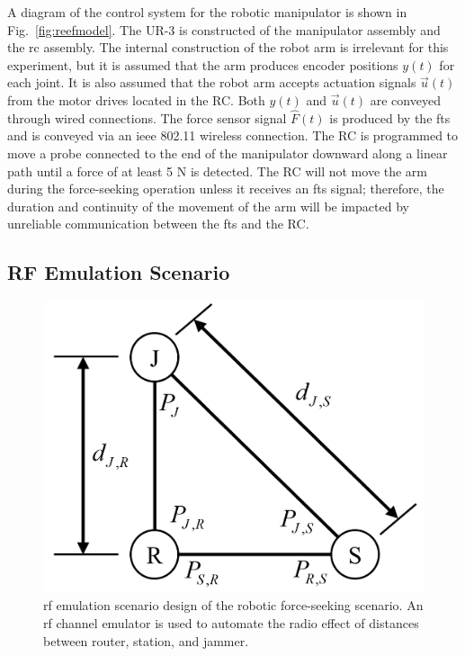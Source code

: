 A diagram of the control system for the robotic manipulator is shown in Fig.~\ref{fig:reefmodel}.  The UR-3 is constructed of the manipulator assembly and the \gls{rc} assembly.  The internal construction of the robot arm is irrelevant for this experiment, but it is assumed that the arm produces encoder positions $y(t)$ for each joint.  It is also assumed that the robot arm accepts actuation signals $\vec{u}(t)$ from the motor drives located in the RC.  Both $y(t)$ and $\vec{u}(t)$ are conveyed through wired connections. The force sensor signal $\hat{F}(t)$ is produced by the \gls{fts} and is conveyed via an \gls{ieee} 802.11 wireless connection. The RC is programmed to move a probe connected to the end of the manipulator downward along a linear path until a force of at least 5 N is detected.  The RC will not move the arm during the force-seeking operation unless it receives an \gls{fts} signal; therefore, the duration and continuity of the movement of the arm will be impacted by unreliable communication between the \gls{fts} and the RC.

\subsection{RF Emulation Scenario}\label{sec:rfemulator}

\begin{figure}[tbp]
	\centering
	\includegraphics[width=0.5\columnwidth]{./chapter-ftml/diagrams/emulation-model}
	\caption{\gls{rf} emulation scenario design of the robotic force-seeking scenario. An \gls{rf} channel emulator is used to automate the radio effect of distances between router, station, and jammer.}
	\label{fig:rf-emulation-scenario}
\end{figure}

